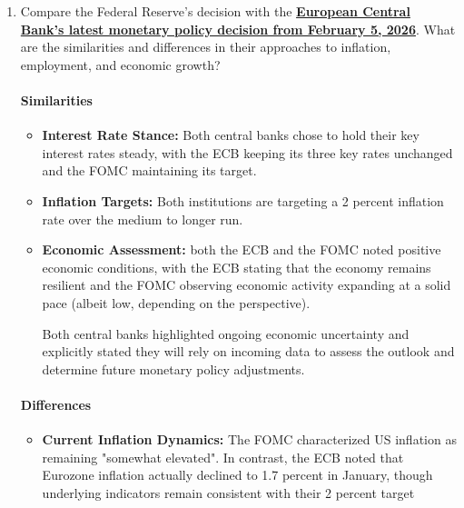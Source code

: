 \documentclass[dvipsnames,11pt]{article}
\begin{document}
\begin{enumerate}
            \item Compare the Federal Reserve's decision with the \textbf{\href{https://www.ecb.europa.eu/press/pr/date/2026/html/ecb.mp260205~001d26959b.en.html}{European Central Bank's latest monetary policy decision from February 5, 2026}}. What are the similarities and differences in their approaches to inflation, employment, and economic growth?

            \begin{solution}

                \paragraph{Similarities}
                
                    \begin{itemize}
                        \item \textbf{Interest Rate Stance:} Both central banks chose to hold their key interest rates steady, with the ECB keeping its three key rates unchanged and the FOMC maintaining its target.

                        \item \textbf{Inflation Targets:} Both institutions are targeting a 2 percent inflation rate over the medium to longer run.

                        \item \textbf{Economic Assessment:} both the ECB and the FOMC noted positive economic conditions, with the ECB stating that the economy remains resilient and the FOMC observing economic activity expanding at a solid pace (albeit low, depending on the perspective).

                        Both central banks highlighted ongoing economic uncertainty and explicitly stated they will rely on incoming data to assess the outlook and determine future monetary policy adjustments.
                    \end{itemize}

                \paragraph{Differences}

                    \begin{itemize}
                        \item \textbf{Current Inflation Dynamics:} The FOMC characterized US inflation as remaining "somewhat elevated". In contrast, the ECB noted that Eurozone inflation actually declined to 1.7 percent in January, though underlying indicators remain consistent with their 2 percent target
                        

\end{itemize}
\end{solution}
\end{enumerate}
\end{document}
